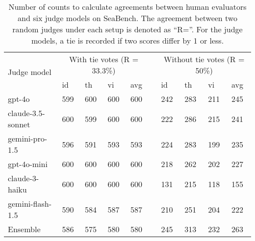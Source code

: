 \begin{table*}[!ht]
    \centering
    \small
    \begin{tabular}{llllllllll}
        \toprule
         \multirow{2}{*}{Judge model}& \multicolumn{4}{c}{With tie votes (R = 33.3\%)} & & \multicolumn{4}{c}{Without tie votes (R = 50\%)} \\ 
         \cmidrule{2-5} \cmidrule{7-10}
        & id & th & vi & avg & & id & th & vi & avg \\ 
        \midrule
        gpt-4o & 599 & 600 & 600 & 600 & & 242 & 283 & 211 & 245 \\ 
        claude-3.5-sonnet & 600 & 599 & 600 & 600 & & 222 & 286 & 215 & 241 \\ 
        gemini-pro-1.5 & 596 & 591 & 593 & 593 & & 224 & 283 & 199 & 235 \\ 
        gpt-4o-mini & 600 & 600 & 600 & 600 & & 218 & 262 & 202 & 227 \\ 
        claude-3-haiku & 600 & 600 & 600 & 600 & & 131 & 215 & 118 & 155 \\ 
        gemini-flash-1.5 & 590 & 584 & 587 & 587 & & 210 & 251 & 204 & 222 \\ 
        \midrule
        Ensemble & 586 & 575 & 580 & 580 &  & 245 & 313 & 232 & 263 \\
        \bottomrule
    \end{tabular}
    \caption{Number of counts to calculate agreements between human evaluators and six judge models on SeaBench. The agreement between two random judges under each setup is denoted as “R=”. For the judge models, a tie is recorded if two scores differ by 1 or less.}
    \label{tab:seabench_agreement_count_1}
\end{table*}